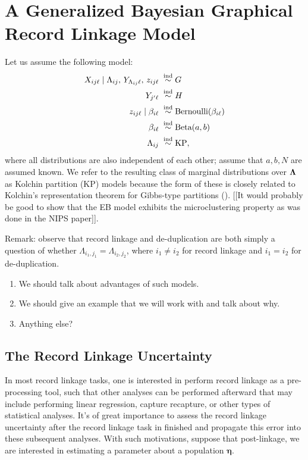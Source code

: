 \documentclass[twoside]{article}
\newcommand{\pop}{\boldsymbol{\eta}}
\begin{document}
\section{A Generalized Bayesian Graphical Record Linkage Model}
\label{sec:general}
Let us assume the following model:
\begin{align}
\label{model:string}
X_{ij\ell}\mid \Lambda_{ij},\,Y_{\Lambda_{ij}\ell},\,z_{ij\ell}\;& \stackrel{\text{ind}}{\sim}G\\
Y_{j'\ell}\;&\stackrel{\text{ind}}{\sim}H \notag \\
z_{ij\ell}\mid\beta_{i\ell}\;&\stackrel{\text{ind}}{\sim}\text{Bernoulli}(\beta_{i\ell}) \notag\\
\beta_{i\ell}\;&\stackrel{\text{ind}}{\sim}\text{Beta}(a,b) \notag \\ 
\Lambda_{ij}\;&\stackrel{\text{ind}}{\sim}\text{KP},
\end{align}
where all distributions are also independent of each other; assume that $a,b, N$ are assumed known. We refer to the resulting class of marginal distributions over $\boldsymbol{\Lambda}$ as Kolchin partition (KP) models \cite{kolchin71problem,pitman06combinatorial} because the form of these is closely related to Kolchin's representation theorem for Gibbs-type partitions (\cite[theorem 1.2]{pitman06combinatorial}). 
[[It would probably be good to show that the EB model exhibits the microclustering property as was done in the NIPS paper]]. 


Remark: observe that record linkage and de-duplication are both simply a question of whether $\Lambda_{i_1,j_1}=\Lambda_{i_2,j_2}$, where $i_1\ne i_2$ for record linkage and $i_1=i_2$ for de-duplication. 

\begin{enumerate}
\item We should talk about advantages of such models. 
\item We should give an example that we will work with and talk about why. 
\item Anything else? 
\end{enumerate}


\subsection{The Record Linkage Uncertainty}
\label{sec:uncertainty}
In most record linkage tasks, one is interested in perform record linkage as a pre-processing tool, such that other analyses can be performed afterward that may include performing linear regression, capture recapture, or other types of statistical analyses. It's of great importance to assess the record linkage uncertainty after the record linkage task in finished and propagate this error into these subsequent analyses. With such motivations, suppose that post-linkage, we are interested in estimating a parameter about a population $\pop.$
\end{document}

